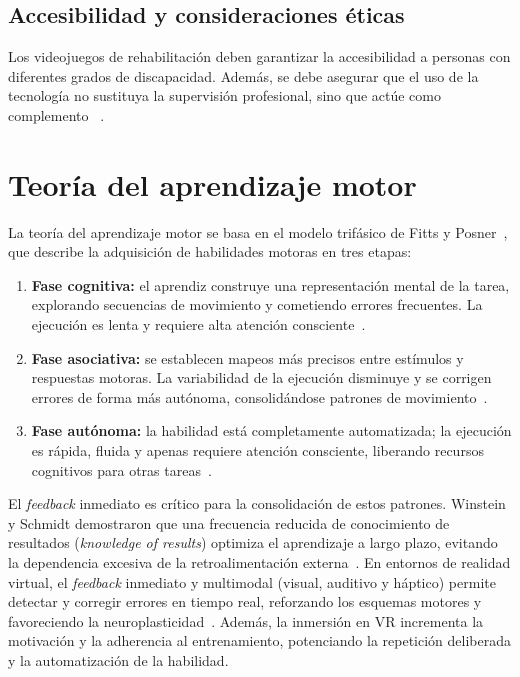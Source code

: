 \subsection{Accesibilidad y consideraciones éticas}

Los videojuegos de rehabilitación deben garantizar la accesibilidad a personas con diferentes grados de discapacidad. Además, se debe asegurar que el uso de la tecnología no sustituya la supervisión profesional, sino que actúe como complemento ~\cite{rodriguez2020reha}.

\section{Teoría del aprendizaje motor}

La teoría del aprendizaje motor se basa en el modelo trifásico de Fitts y Posner~\cite{fitts1967}, que describe la adquisición de habilidades motoras en tres etapas:

\begin{enumerate}
  \item \textbf{Fase cognitiva:} el aprendiz construye una representación mental de la tarea, explorando secuencias de movimiento y cometiendo errores frecuentes. La ejecución es lenta y requiere alta atención consciente~\cite{schmidt2019}.
  \item \textbf{Fase asociativa:} se establecen mapeos más precisos entre estímulos y respuestas motoras. La variabilidad de la ejecución disminuye y se corrigen errores de forma más autónoma, consolidándose patrones de movimiento~\cite{schmidt2019}.
  \item \textbf{Fase autónoma:} la habilidad está completamente automatizada; la ejecución es rápida, fluida y apenas requiere atención consciente, liberando recursos cognitivos para otras tareas~\cite{fitts1967}.
\end{enumerate}

El \emph{feedback} inmediato es crítico para la consolidación de estos patrones. Winstein y Schmidt demostraron que una frecuencia reducida de conocimiento de resultados (\emph{knowledge of results}) optimiza el aprendizaje a largo plazo, evitando la dependencia excesiva de la retroalimentación externa~\cite{winstein1991}. En entornos de realidad virtual, el \emph{feedback} inmediato y multimodal (visual, auditivo y háptico) permite detectar y corregir errores en tiempo real, reforzando los esquemas motores y favoreciendo la neuroplasticidad~\cite{schmidt2019}. Además, la inmersión en VR incrementa la motivación y la adherencia al entrenamiento, potenciando la repetición deliberada y la automatización de la habilidad.

